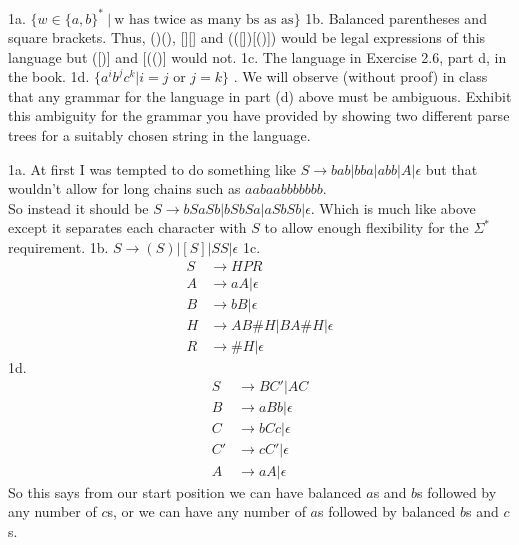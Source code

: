 

\usepackage{subfigure}
\usepackage{graphicx}



\homeworkheader{\classnameandsection}

\begin{problem}{1}
  1a. $\{w \in \{a,b\}^*\ |\ \text{w has twice as many bs as as} \}$
  \br
  1b. Balanced parentheses and square brackets. Thus, ()(), [][] and (([])[()]) would be legal expressions of this
     language but ([)] and [(()] would not.
  \br
  1c. The language in Exercise 2.6, part d, in the book.
  \br
  1d. $\{ a^ib^jc^k | i = j \text{ or } j = k \}$
  . We will observe (without proof) in class that any grammar for the language in part (d) above must be ambiguous.
     Exhibit this ambiguity for the grammar you have provided by showing two different parse trees for a suitably chosen
     string in the language.
  \begin{solution}
    1a. At first I was tempted to do something like $S \rightarrow bab | bba | abb | A | \epsilon$ but that wouldn't
    allow for long chains such as $aabaabbbbbbb$. \\ So instead it should be $S \rightarrow bSaSb | bSbSa |
    aSbSb|\epsilon$. Which is much like above except it separates each character with $S$ to allow enough flexibility
    for the $\Sigma^*$ requirement.
    \br
    1b. $S \rightarrow (S)|[S]|SS|\epsilon$
    \br
    1c.
    \begin{align*}
      S &\rightarrow HPR\\
      A &\rightarrow aA|\epsilon\\
      B &\rightarrow bB|\epsilon\\
      H &\rightarrow AB\#H|BA\#H|\epsilon\\
      R &\rightarrow \#H|\epsilon
    \end{align*}
    \br
    1d.
    \begin{align*}
      S &\rightarrow BC'|AC \\
      B &\rightarrow aBb | \epsilon \\
      C &\rightarrow bCc | \epsilon \\
      C' &\rightarrow cC' | \epsilon \\
      A &\rightarrow aA | \epsilon
    \end{align*}
    So this says from our start position we can have balanced $a$s and $b$s followed by any number of $c$s, or we can
    have any number of $a$s followed by balanced $b$s and $c$s.

\end{solution}
\end{problem}
